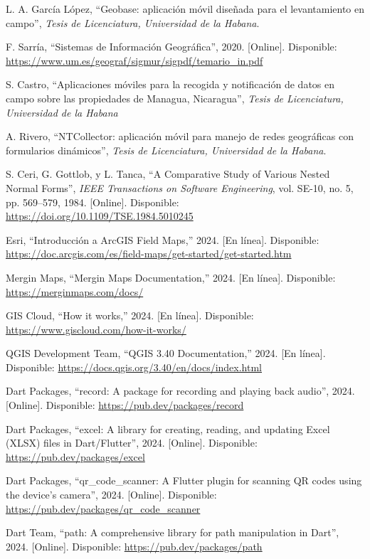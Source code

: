 \documentclass{article}
\begin{document}
\begin{thebibliography}{9}

  L. A. García López, ``Geobase: aplicación móvil diseñada para el levantamiento en campo'', \textit{Tesis de Licenciatura, Universidad de la Habana}.

  F. Sarría, ``Sistemas de Información Geográfica'', 2020. [Online]. Disponible: \url{https://www.um.es/geograf/sigmur/sigpdf/temario_in.pdf}
  
  S. Castro, ``Aplicaciones móviles para la recogida y notificación de datos en campo sobre las propiedades de Managua, Nicaragua'', \textit{Tesis de Licenciatura, Universidad de la Habana}
  
  A. Rivero, ``NTCollector: aplicación móvil para manejo de redes geográficas con formularios dinámicos'', \textit{Tesis de Licenciatura, Universidad de la Habana}.

  S. Ceri, G. Gottlob, y L. Tanca, ``A Comparative Study of Various Nested Normal Forms'', \textit{IEEE Transactions on Software Engineering}, vol. SE-10, no. 5, pp. 569--579, 1984. [Online]. Disponible: \url{https://doi.org/10.1109/TSE.1984.5010245}

  Esri, ``Introducción a ArcGIS Field Maps,'' 2024. [En línea]. Disponible: \url{https://doc.arcgis.com/es/field-maps/get-started/get-started.htm}

  Mergin Maps, ``Mergin Maps Documentation,'' 2024. [En línea]. Disponible: \url{https://merginmaps.com/docs/}

  GIS Cloud, ``How it works,'' 2024. [En línea]. Disponible: \url{https://www.giscloud.com/how-it-works/}

  QGIS Development Team, ``QGIS 3.40 Documentation,'' 2024. [En línea]. Disponible: \url{https://docs.qgis.org/3.40/en/docs/index.html}

  Dart Packages, ``record: A package for recording and playing back audio'', 2024. [Online]. Disponible: \url{https://pub.dev/packages/record}

  Dart Packages, ``excel: A library for creating, reading, and updating Excel (XLSX) files in Dart/Flutter'', 2024. [Online]. Disponible: \url{https://pub.dev/packages/excel}
  
  Dart Packages, ``qr\_code\_scanner: A Flutter plugin for scanning QR codes using the device's camera'', 2024. [Online]. Disponible: \url{https://pub.dev/packages/qr_code_scanner}

  Dart Team, ``path: A comprehensive library for path manipulation in Dart'', 2024. [Online]. Disponible: \url{https://pub.dev/packages/path}

\end{thebibliography}
\end{document}
